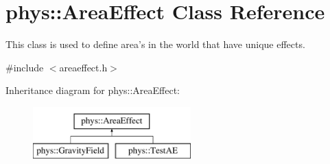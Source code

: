 \hypertarget{classphys_1_1AreaEffect}{
\section{phys::AreaEffect Class Reference}
\label{d4/d55/classphys_1_1AreaEffect}
}


This class is used to define area's in the world that have unique effects.  




{\ttfamily \#include $<$areaeffect.h$>$}

Inheritance diagram for phys::AreaEffect:\begin{figure}[H]
\begin{center}
\leavevmode
\includegraphics[height=2.000000cm]{d4/d55/classphys_1_1AreaEffect}
\end{center}
\end{figure}
